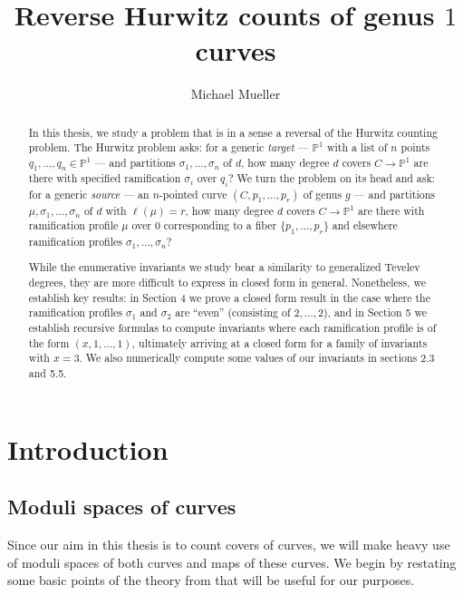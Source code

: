 \documentclass[11pt]{article}           %
\renewcommand{\P}{\mathbb P}
\theoremstyle{definition}
\begin{document}
\title{Reverse Hurwitz counts of genus $1$ curves}

\author{Michael Mueller}

\begin{abstract}
  In this thesis, we study a problem that is in a sense a reversal of the Hurwitz
counting problem. The Hurwitz problem asks: for a
generic {\it target} --- $\P^1$ with a list of $n$ points  $q_1,\dots,q_n\in \P^1$ --- and
partitions $\sigma_1,\dots,\sigma_n$ of $d$, how many degree
$d$ covers $C\to\P^1$ are there with specified ramification $\sigma_i$ over $q_i$?
We turn the problem on its head and ask: for a generic {\it source} --- an $n$-pointed curve
$(C,p_1,\dots,p_r)$ of genus $g$ --- and
partitions $\mu,\sigma_1,\dots,\sigma_n$ of $d$ with $\ell(\mu)=r$,
how many degree $d$ covers $C\to\P^1$ are there with ramification profile $\mu$ over $0$
corresponding to a fiber $\{p_1,\dots,p_r\}$ and
elsewhere ramification profiles $\sigma_1,\dots,\sigma_n$?

While the enumerative invariants we study bear a similarity to
generalized Tevelev degrees, they are more difficult to express in
closed form in general. Nonetheless, we establish key results:
in Section 4 we prove a closed form result in the case where
the ramification profiles $\sigma_1$ and $\sigma_2$ are
``even'' (consisting of $2,\dots,2$), and in Section 5 we establish
recursive formulas to compute invariants where each ramification
profile is of the form $(x,1,\dots,1)$, ultimately arriving at
a closed form for a family of invariants with $x=3$.
We also numerically compute some values of our invariants in sections
2.3 and 5.5.


  \end{abstract}

\maketitle


\tableofcontents

\section{Introduction}

\subsection{Moduli spaces of curves}

Since our aim in this thesis is to count covers of curves, we
will make heavy use of moduli spaces of both curves and maps
of these curves. We begin by restating some basic points of the theory
from \cite{Moduli}
that will be useful for our purposes.
\end{document}
